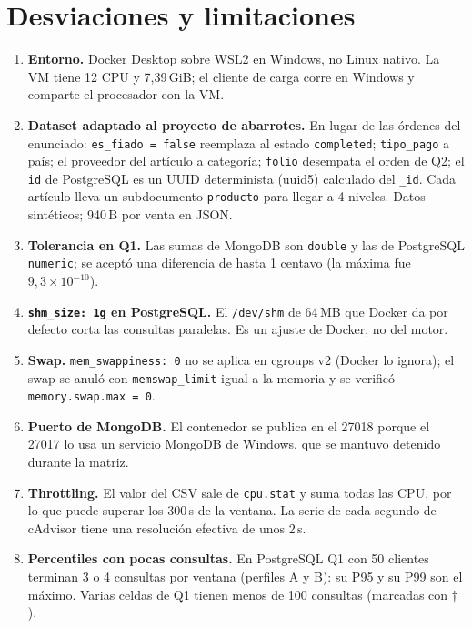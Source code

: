 \documentclass[11pt,a4paper]{article}
\newcommand{\cod}[1]{\texttt{#1}}
\begin{document}
\section*{Desviaciones y limitaciones}\label{sec:desviaciones}
\begin{enumerate}
\item \textbf{Entorno.} Docker Desktop sobre WSL2 en Windows, no Linux nativo. La VM tiene
  12 CPU y 7,39\,GiB; el cliente de carga corre en Windows y comparte el procesador con la
  VM.
\item \textbf{Dataset adaptado al proyecto de abarrotes.} En lugar de las órdenes del
  enunciado: \cod{es\_fiado = false} reemplaza al estado \cod{completed}; \cod{tipo\_pago}
  a país; el proveedor del artículo a categoría; \cod{folio} desempata el orden de Q2; el
  \cod{id} de PostgreSQL es un UUID determinista (uuid5) calculado del \cod{\_id}. Cada
  artículo lleva un subdocumento \cod{producto} para llegar a 4 niveles. Datos
  sintéticos; 940\,B por venta en JSON.
\item \textbf{Tolerancia en Q1.} Las sumas de MongoDB son \cod{double} y las de
  PostgreSQL \cod{numeric}; se aceptó una diferencia de hasta 1 centavo (la máxima fue
  $9{,}3\times10^{-10}$).
\item \textbf{\cod{shm\_size: 1g} en PostgreSQL.} El \cod{/dev/shm} de 64\,MB que Docker
  da por defecto corta las consultas paralelas. Es un ajuste de Docker, no del motor.
\item \textbf{Swap.} \cod{mem\_swappiness: 0} no se aplica en cgroups v2 (Docker lo
  ignora); el swap se anuló con \cod{memswap\_limit} igual a la memoria y se verificó
  \cod{memory.swap.max = 0}.
\item \textbf{Puerto de MongoDB.} El contenedor se publica en el 27018 porque el 27017 lo
  usa un servicio MongoDB de Windows, que se mantuvo detenido durante la matriz.
\item \textbf{Throttling.} El valor del CSV sale de \cod{cpu.stat} y suma todas las CPU,
  por lo que puede superar los 300\,s de la ventana. La serie de cada segundo de cAdvisor
  tiene una resolución efectiva de unos 2\,s.
\item \textbf{Percentiles con pocas consultas.} En PostgreSQL Q1 con 50 clientes
  terminan 3 o 4 consultas por ventana (perfiles A y B): su P95 y su P99 son el máximo.
  Varias celdas de Q1 tienen menos de 100 consultas (marcadas con $\dagger$).

\end{enumerate}
\end{document}
